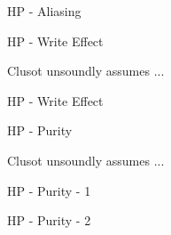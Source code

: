 \begin{frame}[fragile]{HP - Aliasing}
\vspace*{-0.4cm}
\only<1>{}
\end{frame}


\begin{frame}{HP - Write Effect}

\vspace*{-0.4cm}

Clusot unsoundly assumes ...

\end{frame}

\begin{frame}[fragile]{HP - Write Effect}
\vspace*{-0.4cm}
\only<1>{}
\end{frame}


\begin{frame}{HP - Purity}

\vspace*{-0.4cm}

Clusot unsoundly assumes ...

\end{frame}


\begin{frame}[fragile]{HP - Purity - 1}
\vspace*{-0.4cm}
\only<1>{}
\end{frame}


\begin{frame}[fragile]{HP - Purity - 2}
\vspace*{-0.4cm}
\only<1>{}
\end{frame}

